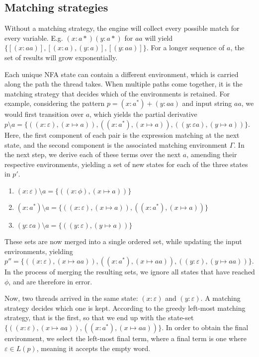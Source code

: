 \subsection{Matching strategies}

Without a matching strategy, the engine will collect every possible match for
every variable. E.g. $(x:a*)(y:a*)$ for $aa$ will yield $\{[(x:aa)], [(x:a),
(y:a)], [(y:aa)]\}$. For a longer sequence of $a$, the set of results will grow
exponentially.

Each unique NFA state can contain a different environment, which is carried
along the path the thread takes. When multiple paths come together, it is the
matching strategy that decides which of the environments is retained. For
example, considering the pattern $p = (x:a^*) + (y:aa)$ and input string $aa$,
we would first transition over $a$, which yields the partial derivative $p
\setminus a = \{ ((x:\varepsilon), (x \mapsto a)), ((x:a^*), (x \mapsto a)),
((y:\varepsilon a), (y \mapsto a)) \}$. Here, the first component of each pair
is the expression matching at the next state, and the second component is the
associated matching environment $\Gamma$. In the next step, we derive each of
these terms over the next $a$, amending their respective environments, yielding
a set of new states for each of the three states in $p'$.

\begin{enumerate}
   \item
      $(x:\varepsilon) \setminus a = \{ ((x:\phi), (x \mapsto a)) \}$
   \item
      $(x:a^*) \setminus a = \{
         ((x:\varepsilon), (x \mapsto a)),
         ((x:a^*), (x \mapsto a))
      \}$
   \item
      $(y:\varepsilon a) \setminus a = \{ ((y:\varepsilon), (y \mapsto a)) \}$
\end{enumerate}

These sets are now merged into a single ordered set, while updating the input
environments, yielding $p'' = \{ ((x:\varepsilon), (x \mapsto aa)), ((x:a^*), (x
\mapsto aa)), ((y:\varepsilon), (y \mapsto aa)) \}$. In the process of merging
the resulting sets, we ignore all states that have reached $\phi$, and are
therefore in error.

Now, two threads arrived in the same state: $(x:\varepsilon)$ and
$(y:\varepsilon)$. A matching strategy decides which one is kept. According to
the greedy left-most matching strategy, that is the first, so that we end up
with the state-set $\{ ((x:\varepsilon), (x \mapsto aa)), ((x:a^*), (x \mapsto
aa)) \}$. In order to obtain the final environment, we select the left-most
final term, where a final term is one where $\varepsilon \in L(p)$, meaning it
accepts the empty word.


